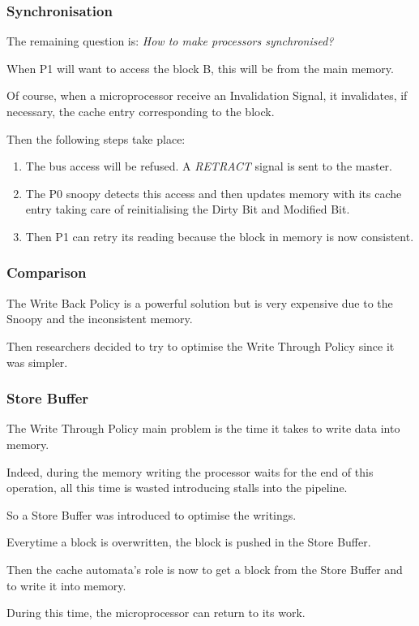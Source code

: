 \begin{frame}
  \frametitle{Synchronisation}

  The remaining question is: \textit{How to make processors synchronised?}

  \-

  When P1 will want to access the block B, this will be from the main memory.

  \-

  Of course, when a microprocessor receive an Invalidation Signal, it
  invalidates, if necessary, the cache entry corresponding to the block.

  \-

  Then the following steps take place:

  \begin{enumerate}[<+->]
    \item
      The bus access will be refused. A \textit{RETRACT} signal is sent
      to the master.
    \item
      The P0 snoopy detects this access and then updates memory with
      its cache entry taking care of reinitialising the Dirty Bit and Modified
      Bit.
    \item
      Then P1 can retry its reading because the block in memory is now
      consistent.
  \end{enumerate}
\end{frame}


\begin{frame}
  \frametitle{Comparison}

  The Write Back Policy is a powerful solution but is very expensive
  due to the Snoopy and the inconsistent memory.

  \-

  Then researchers decided to try to optimise the Write Through Policy
  since it was simpler.
\end{frame}


\begin{frame}
  \frametitle{Store Buffer}

  The Write Through Policy main problem is the time it takes to write
  data into memory.

  \-

  Indeed, during the memory writing the processor waits for the end of this
  operation, all this time is wasted introducing stalls into the pipeline.

  \-

  So a Store Buffer was introduced to optimise the writings.

  \-

  Everytime a block is overwritten, the block is pushed in the Store Buffer.

  \-

  Then the cache automata's role is now to get a block from the Store Buffer
  and to write it into memory.

  \-

  During this time, the microprocessor can return to its work.
\end{frame}

